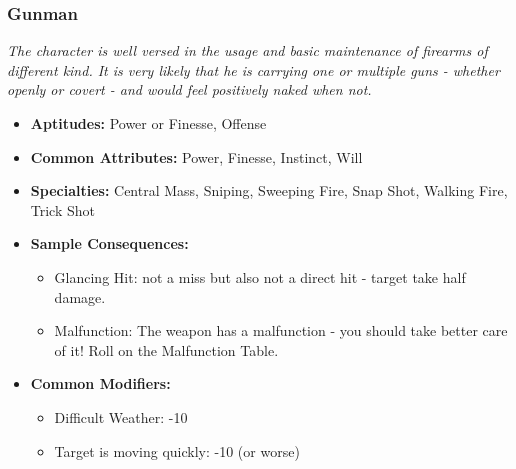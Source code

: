 \subsubsection{Gunman}\label{Gunman}
\textit{The character is well versed in the usage and basic maintenance of firearms of different kind.
It is very likely that he is carrying one or multiple guns - whether openly or covert - and would feel positively naked when not.}
\begin{itemize}
	\item \textbf{Aptitudes:} Power or Finesse, Offense
	\item \textbf{Common Attributes:} Power, Finesse, Instinct, Will
	\item \textbf{Specialties:} Central Mass, Sniping, Sweeping Fire, Snap Shot, Walking Fire, Trick Shot
	\item \textbf{Sample Consequences:}
	\begin{itemize}
		\item Glancing Hit: not a miss but also not a direct hit - target take half damage.
		\item Malfunction: The weapon has a malfunction - you should take better care of it! Roll on the Malfunction Table.
	\end{itemize}
	\item \textbf{Common Modifiers:}
	\begin{itemize}
		\item Difficult Weather: -10
		\item Target is moving quickly: -10 (or worse)
	\end{itemize}
\end{itemize}

